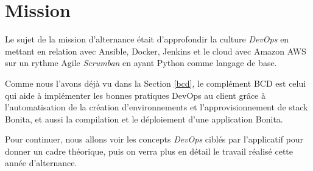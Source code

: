 \section{Mission}
Le sujet de la mission d’alternance était d'approfondir la culture \emph{DevOps} en mettant en relation avec Ansible, Docker, Jenkins et le cloud avec Amazon AWS sur un rythme Agile \textit{Scrumban} en ayant Python comme langage de base.

Comme nous l’avons déjà vu dans la Section \ref{bcd}, le complément BCD est celui qui aide à implémenter les bonnes pratiques DevOps au client grâce à l'automatisation de la création d'environnements et l'approvisionnement de stack Bonita, et aussi la compilation et le déploiement d'une application Bonita.

Pour continuer, nous allons voir les concepts \emph{DevOps} ciblés par l'applicatif pour donner un cadre théorique, puis on verra plus en détail le travail réalisé cette année d'alternance.














